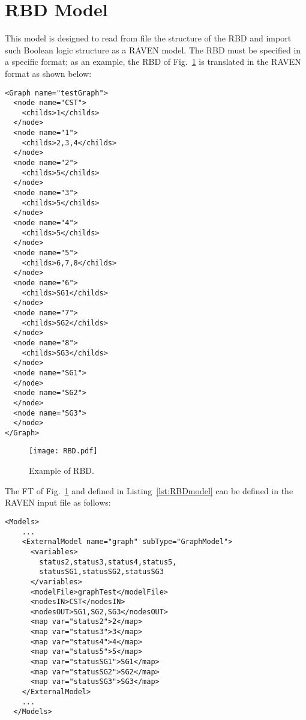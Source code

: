 \section{RBD Model}
\label{sec:RBDmodel}

This model is designed to read from file the structure of the RBD and import such Boolean logic structure as a RAVEN model.
The RBD must be specified in a specific format; as an example, the RBD of Fig.~\ref{fig:RBD} is translated in the RAVEN format as shown below:

\begin{lstlisting}[style=XML,morekeywords={anAttribute},caption=RBD input file., label=lst:RBDmodel]
<Graph name="testGraph">
  <node name="CST">
    <childs>1</childs>
  </node>
  <node name="1">
    <childs>2,3,4</childs>
  </node>
  <node name="2">
    <childs>5</childs>
  </node>
  <node name="3">
    <childs>5</childs>
  </node>
  <node name="4">
    <childs>5</childs>
  </node>
  <node name="5">
    <childs>6,7,8</childs>
  </node>
  <node name="6">
    <childs>SG1</childs>
  </node>
  <node name="7">
    <childs>SG2</childs>
  </node>
  <node name="8">
    <childs>SG3</childs>
  </node>
  <node name="SG1">
  </node>
  <node name="SG2">
  </node>
  <node name="SG3">
  </node>
</Graph>
\end{lstlisting}

\begin{figure}
    \centering
    \centerline{\texttt{[image: RBD.pdf]}}
    \caption{Example of RBD.}
    \label{fig:RBD}
\end{figure}

The FT of Fig.~\ref{fig:RBD} and defined in Listing~\ref{lst:RBDmodel} can be defined in the RAVEN input file as follows:

\begin{lstlisting}[style=XML,morekeywords={anAttribute},caption=RBD model input example., label=lst:RBD_InputExample]
  <Models>
    ...
    <ExternalModel name="graph" subType="GraphModel">
      <variables>
        status2,status3,status4,status5,
        statusSG1,statusSG2,statusSG3
      </variables>
      <modelFile>graphTest</modelFile>
      <nodesIN>CST</nodesIN>
      <nodesOUT>SG1,SG2,SG3</nodesOUT>
      <map var="status2">2</map>
      <map var="status3">3</map>
      <map var="status4">4</map>
      <map var="status5">5</map>
      <map var="statusSG1">SG1</map>
      <map var="statusSG2">SG2</map>
      <map var="statusSG3">SG3</map>
    </ExternalModel>
    ...
  </Models>
\end{lstlisting}

